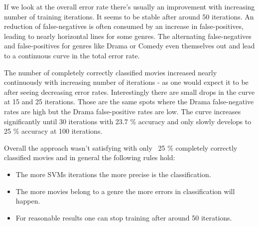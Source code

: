 \documentclass{vldb}
\begin{document}
\par If we look at the overall error rate there’s usually an improvement with increasing number of training iterations. It seems to be stable after around 50 iterations. An reduction of false-negatives is often consumed by an increase in false-positives, leading to nearly horizontal lines for some genres. The alternating false-negatives and false-positives for genres like Drama or Comedy even themselves out and lead to a continuous curve in the total error rate.
\par The number of completely correctly classified movies increased nearly continuously with increasing number of iterations - as one would expect it to be after seeing decreasing error rates. Interestingly there are small drops in the curve at 15 and 25 iterations. Those are the same spots where the Drama false-negative rates are high but the Drama false-positive rates are low. The curve increases significantly until 30 iterations with 23.7 \% accuracy and only slowly develops to 25 \% accuracy at 100 iterations.
\par Overall the approach wasn’t satisfying with only ~25 \% completely correctly classified movies and in general the following rules hold:
\begin{itemize}
\item {The more SVMs iterations the more precise is the classification.}
\item {The more movies belong to a genre the more errors in classification will happen.}
\item {For reasonable results one can stop training after around 50 iterations.}
\end{itemize}
\end{document}
